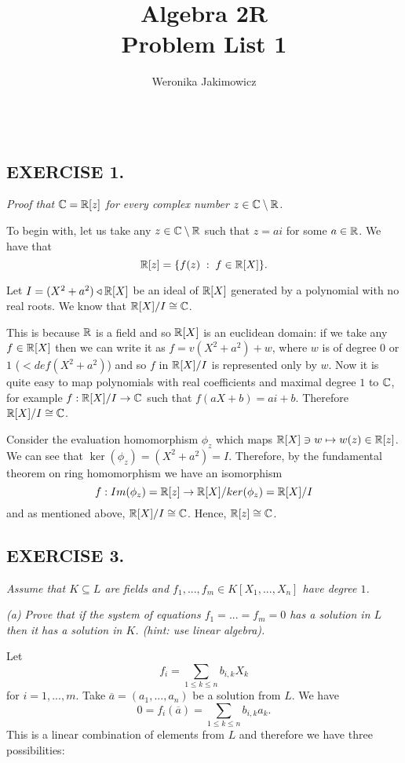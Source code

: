 \documentclass{article}
\title{\large Algebra 2R\smallskip\\ \textbf{Problem List 1}}
\author{\normalsize Weronika Jakimowicz}
\date{~~~}
\begin{document}
\maketitle
\thispagestyle{empty}

\subsection*{EXERCISE 1.}
\emph{Proof that $\mathbb{C}=\mathbb{R}[z]$ for every complex number $z\in \mathbb{C}\setminus\mathbb{R}$.}
\smallskip

To begin with, let us take any $z\in\mathbb{C}\setminus\mathbb{R}$ such that $z=ai$ for some $a\in\mathbb{R}$. We have that
$$\mathbb{R}[z]=\{f(z)\;:\;f\in\mathbb{R}[X]\}.$$

Let $I=(X^2+a^2)\triangleleft\mathbb{R}[X]$ be an ideal of $\mathbb{R}[X]$ generated by a polynomial with no real roots. We know that $\mathbb{R}[X]/I\cong \mathbb{C}$. 

This is because $\mathbb{R}$ is a field and so $\mathbb{R}[X]$ is an euclidean domain: if we take any $f\in\mathbb{R}[X]$ then we can write it as $f=v(X^2+a^2)+w$, where $w$ is of degree $0$ or $1$ ($<def(X^2+a^2)$) and so $f$ in $\mathbb{R}[X]/I$ is represented only by $w$. Now it is quite easy to map polynomials with real coefficients and maximal degree $1$ to $\mathbb{C}$, for example $f:\mathbb{R}[X]/I\to\mathbb{C}$ such that $f(aX+b)=ai+b$. Therefore $\mathbb{R}[X]/I\cong \mathbb{C}$.

Consider the evaluation homomorphism $\phi_z$ which maps $\mathbb{R}[X]\ni w\mapsto w(z)\in\mathbb{R}[z]$. We can see that $\ker(\phi_z)=(X^2+a^2)=I$. Therefore, by the fundamental theorem on ring homomorphism we have an isomorphism
$$f:Im(\phi_z)=\mathbb{R}[z]\to \mathbb{R}[X]/ker(\phi_z)=\mathbb{R}[X]/I$$
and as mentioned above, $\mathbb{R}[X]/I\cong\mathbb{C}$. Hence, $\mathbb{R}[z]\cong\mathbb{C}$.

\proofend

\subsection*{EXERCISE 3.}
\emph{Assume that $K\subseteq L$ are fields and $f_1,...,f_m\in K[X_1,...,X_n]$ have degree $1$.}

\emph{(a) Prove that if the system of equations $f_1=...=f_m=0$ has a solution in $L$ then it has a solution in $K$. (hint: use linear algebra).}

Let
$$f_i=\sum\limits_{1\leq k\leq n}b_{i, k}X_k$$
for $i=1,...,m$. Take $\overline a=(a_1,..., a_n)$ be a solution from $L$. We have
$$0=f_i(\overline a)=\sum\limits_{1\leq k\leq n}b_{i, k}a_k.$$
This is a linear combination of elements from $L$ and therefore we have three possibilities:
\end{document}
